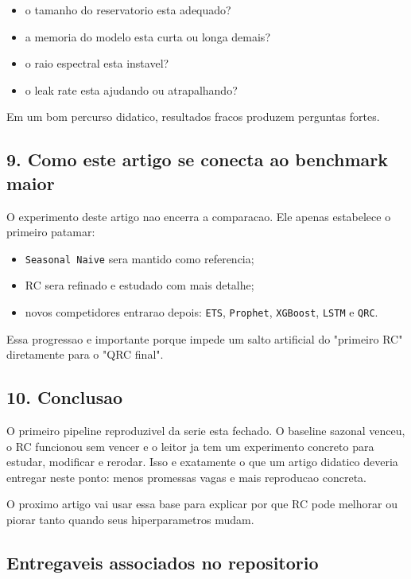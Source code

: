 \documentclass[12pt]{article}
\providecommand{\tightlist}{%
          \setlength{\itemsep}{0pt}\setlength{\parskip}{0pt}}
\begin{document}
\begin{itemize}
\tightlist
\item
  o tamanho do reservatorio esta adequado?
\item
  a memoria do modelo esta curta ou longa demais?
\item
  o raio espectral esta instavel?
\item
  o leak rate esta ajudando ou atrapalhando?
\end{itemize}

Em um bom percurso didatico, resultados fracos produzem perguntas fortes.

\subsection{9. Como este artigo se conecta ao benchmark maior}\label{9-como-este-artigo-se-conecta-ao-benchmark-maior}

O experimento deste artigo nao encerra a comparacao. Ele apenas estabelece o primeiro patamar:

\begin{itemize}
\tightlist
\item
  \texttt{Seasonal\ Naive} sera mantido como referencia;
\item
  RC sera refinado e estudado com mais detalhe;
\item
  novos competidores entrarao depois: \texttt{ETS}, \texttt{Prophet}, \texttt{XGBoost}, \texttt{LSTM} e \texttt{QRC}.
\end{itemize}

Essa progressao e importante porque impede um salto artificial do "primeiro RC" diretamente para o "QRC final".

\subsection{10. Conclusao}\label{10-conclusao}

O primeiro pipeline reproduzivel da serie esta fechado. O baseline sazonal venceu, o RC funcionou sem vencer e o leitor ja tem um experimento concreto para estudar, modificar e rerodar. Isso e exatamente o que um artigo didatico deveria entregar neste ponto: menos promessas vagas e mais reproducao concreta.

O proximo artigo vai usar essa base para explicar por que RC pode melhorar ou piorar tanto quando seus hiperparametros mudam.

\subsection{Entregaveis associados no repositorio}\label{entregaveis-associados-no-repositorio}
\end{document}
